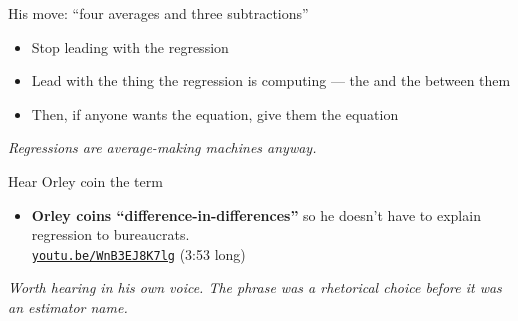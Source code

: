 \documentclass[aspectratio=169,11pt]{beamer}
\begin{document}
\begin{frame}{His move: ``four averages and three subtractions''}
\vspace{0.6em}
\begin{itemize}
  \item Stop leading with the regression
  \item Lead with the thing the regression is computing --- the  and the  between them
  \item Then, if anyone wants the equation, give them the equation
\end{itemize}
\vspace{0.8em}
\begin{center}
\small\color{warmgray}\itshape Regressions are average-making machines anyway.
\end{center}
\end{frame}

\begin{frame}{Hear Orley coin the term}
\vspace{0.8em}
\begin{itemize}
  \item \textbf{Orley coins ``difference-in-differences''} so he doesn't have to explain regression to bureaucrats. \\[0.4em]
        \href{https://youtu.be/WnB3EJ8K7lg?si=uE4clqUIPzvbxm0r&t=1}{\color{ocean}\texttt{youtu.be/WnB3EJ8K7lg}} \;(3:53 long)
\end{itemize}
\vspace{0.8em}
\begin{center}
\small\color{warmgray}\itshape
Worth hearing in his own voice. The phrase was a rhetorical choice before it was an estimator name.
\end{center}
\end{frame}
\end{document}
